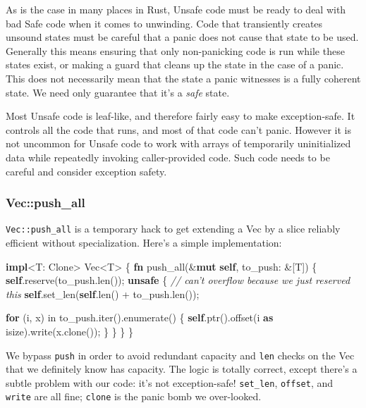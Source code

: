\documentclass[a4paper,]{book}
\newenvironment{Shaded}{\begin{snugshade}}{\end{snugshade}}
\newcommand{\KeywordTok}[1]{\textcolor[rgb]{0.13,0.29,0.53}{\textbf{{#1}}}}
\newcommand{\CommentTok}[1]{\textcolor[rgb]{0.56,0.35,0.01}{\textit{{#1}}}}
\newcommand{\NormalTok}[1]{{#1}}
\begin{document}
As is the case in many places in Rust, Unsafe code must be ready to deal
with bad Safe code when it comes to unwinding. Code that transiently
creates unsound states must be careful that a panic does not cause that
state to be used. Generally this means ensuring that only non-panicking
code is run while these states exist, or making a guard that cleans up
the state in the case of a panic. This does not necessarily mean that
the state a panic witnesses is a fully coherent state. We need only
guarantee that it's a \emph{safe} state.

Most Unsafe code is leaf-like, and therefore fairly easy to make
exception-safe. It controls all the code that runs, and most of that
code can't panic. However it is not uncommon for Unsafe code to work
with arrays of temporarily uninitialized data while repeatedly invoking
caller-provided code. Such code needs to be careful and consider
exception safety.

\subsubsection{Vec::push\_all}\label{vecpushux5fall}

\texttt{Vec::push\_all} is a temporary hack to get extending a Vec by a
slice reliably efficient without specialization. Here's a simple
implementation:

\begin{Shaded}
\begin{Highlighting}[]
\KeywordTok{impl}\NormalTok{<T: Clone> Vec<T> \{}
    \KeywordTok{fn} \NormalTok{push_all(&}\KeywordTok{mut} \KeywordTok{self}\NormalTok{, to_push: &[T]) \{}
        \KeywordTok{self}\NormalTok{.reserve(to_push.len());}
        \KeywordTok{unsafe} \NormalTok{\{}
            \CommentTok{// can't overflow because we just reserved this}
            \KeywordTok{self}\NormalTok{.set_len(}\KeywordTok{self}\NormalTok{.len() + to_push.len());}

            \KeywordTok{for} \NormalTok{(i, x) in to_push.iter().enumerate() \{}
                \KeywordTok{self}\NormalTok{.ptr().offset(i }\KeywordTok{as} \NormalTok{isize).write(x.clone());}
            \NormalTok{\}}
        \NormalTok{\}}
    \NormalTok{\}}
\NormalTok{\}}
\end{Highlighting}
\end{Shaded}

We bypass \texttt{push} in order to avoid redundant capacity and
\texttt{len} checks on the Vec that we definitely know has capacity. The
logic is totally correct, except there's a subtle problem with our code:
it's not exception-safe! \texttt{set\_len}, \texttt{offset}, and
\texttt{write} are all fine; \texttt{clone} is the panic bomb we
over-looked.
\end{document}
